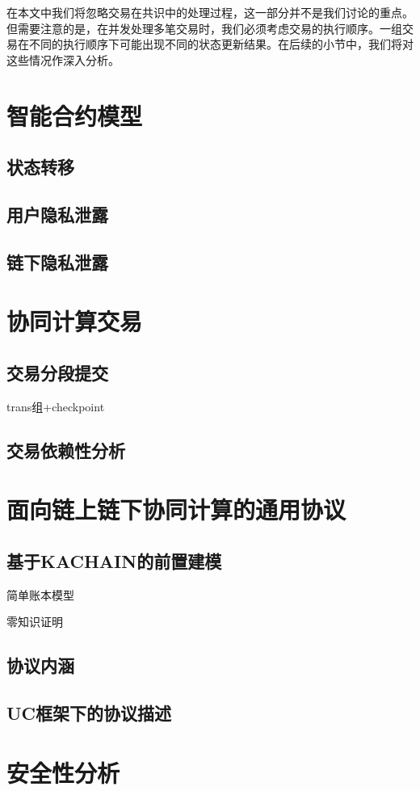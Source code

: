 在本文中我们将忽略交易在共识中的处理过程，这一部分并不是我们讨论的重点。但需要注意的是，在并发处理多笔交易时，我们必须考虑交易的执行顺序。一组交易在不同的执行顺序下可能出现不同的状态更新结果。在后续的小节中，我们将对这些情况作深入分析。
\section{智能合约模型}
\subsection{状态转移}
\subsection{用户隐私泄露}

\subsection{链下隐私泄露}

\section{协同计算交易}

\subsection{交易分段提交}

trans组+checkpoint
\subsection{交易依赖性分析}

\section{面向链上链下协同计算的通用协议}
\subsection{基于KACHAIN的前置建模}
简单账本模型

零知识证明
\subsection{协议内涵}
\subsection{UC框架下的协议描述}

\section{安全性分析}

